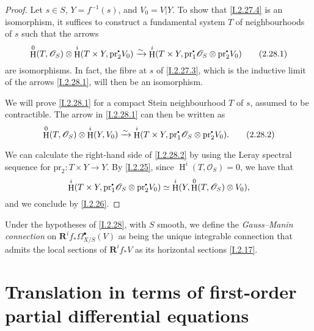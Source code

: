 \documentclass{report}
\theoremstyle{plain}
\theoremstyle{definition}
\newenvironment{env}[1]
    {\renewcommand\theinnercustomenv{#1}\innercustomenv}
    {\endinnercustomenv}
\newcommand{\sh}{\mathscr}
\newcommand{\sbullet}{{\mathbin{\vcenter{\hbox{\scalebox{.5}{$\bullet$}}}}}}
\newcommand{\pr}{\mathrm{pr}}
\newcommand{\RR}{\mathbf{R}}
\DeclareMathOperator{\HH}{H}
\newcommand{\oldpage}[1]{\marginpar{\footnotesize$\Big\vert$ \textit{p.~#1}}}
\begin{document}
\begin{proof}
  Let $s\in S$, $Y=f^{-1}(s)$, and $V_0=V|Y$.
  To show that \cref{I.2.27.4} is an isomorphism, it suffices to construct a fundamental system $T$ of neighbourhoods of $s$ such that the arrows
  \[
  \label{I.2.28.1}
    \HH^0(T,\sh{O}_S) \otimes \HH^i(T\times Y,\pr_2^\sbullet V_0) \xrightarrow{\sim} \HH^i(T\times Y,\pr_1^\sbullet\sh{O}_S \otimes \pr_2^\sbullet V_0)
  \tag{2.28.1}
  \]
  are isomorphisms.
  In fact, the fibre at $s$ of \cref{I.2.27.3}, which is the inductive limit of the arrows \cref{I.2.28.1}, will then be an isomorphism.

  We will prove \cref{I.2.28.1} for a compact Stein neighbourhood $T$ of $s$, assumed to be contractible.
  The arrow in \cref{I.2.28.1} can then be written as
\oldpage{21}
  \[
  \label{I.2.28.2}
    \HH^0(T,\sh{O}_S) \otimes \HH^i(Y,V_0) \xrightarrow{\sim} \HH^i(T\times Y,\pr_1^\sbullet\sh{O}_S \otimes \pr_2^\sbullet V_0).
  \tag{2.28.2}
  \]

  We can calculate the right-hand side of \cref{I.2.28.2} by using the Leray spectral sequence for $\pr_2\colon T\times Y\to Y$.
  By \cref{I.2.25}, since $\HH^i(T,\sh{O}_S)=0$, we have that
  \[
    \HH^i(T\times Y,\pr_1^\sbullet\sh{O}_S \otimes \pr_2^\sbullet V_0) \simeq \HH^i(Y,\HH^0(T,\sh{O}_S) \otimes V_0),
  \]
  and we conclude by \cref{I.2.26}.
\end{proof}

\begin{env}{2.29}
\label{I.2.29}
  Under the hypotheses of \cref{I.2.28}, with $S$ smooth, we define the \emph{Gauss--Manin connection} on $\RR^i f_*\Omega_{X/S}^\bullet(V)$ as being the unique integrable connection that admits the local sections of $\RR^i f_*V$ as its horizontal sections \cref{I.2.17}.
\end{env}



\section{Translation in terms of first-order partial differential equations}
\label{I.3}
\end{document}
